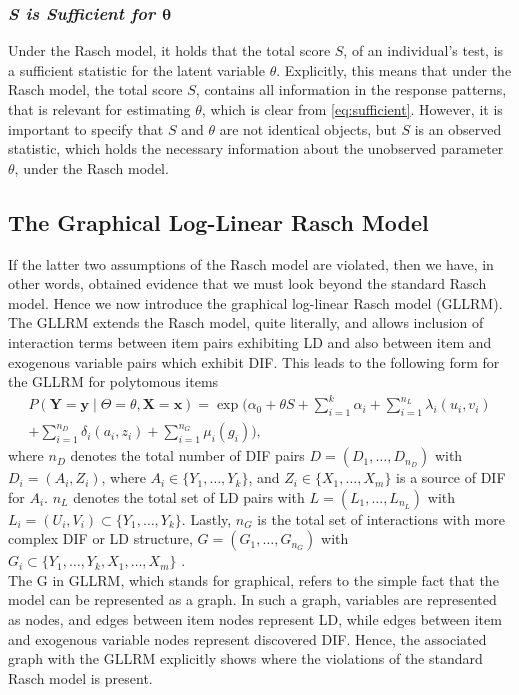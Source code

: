 \documentclass[a4project,12pt]{article}
\theoremstyle{examplestyle}
\theoremstyle{defstyle}
\theoremstyle{thmstyle}
\begin{document}
\subsubsection{\textit{\textbf{\textit{S}} is Sufficient for $\mathbf{\theta}$}}
Under the Rasch model, it holds that the total score $S$, of an individual's test, is a sufficient statistic for the latent variable $\theta$. Explicitly, this means that under the Rasch model, the total score $S$, contains all information in the response patterns, that is relevant for estimating $\theta$, which is clear from \eqref{eq:sufficient}. However, it is important to specify that $S$ and $\theta$ are not identical objects, but $S$ is an observed statistic, which holds the necessary information about the unobserved parameter $\theta$, under the Rasch model.

\subsection{The Graphical Log-Linear Rasch Model}
If the latter two assumptions of the Rasch model are violated, then we have, in other words, obtained evidence that we must look beyond the standard Rasch model. Hence we now introduce the graphical log-linear Rasch model (GLLRM). The GLLRM extends the Rasch model, quite literally, and allows inclusion of interaction terms between item pairs exhibiting LD and also between item and exogenous variable pairs which exhibit DIF. This leads to the following form for the GLLRM for polytomous items 
\begin{align}
    P(\mathbf{Y}=\mathbf{y}\mid \Theta=\theta,\mathbf{X}=\mathbf{x}) = \exp\Big(\alpha_0+\theta S+\sum_{i=1}^k\alpha_i+\sum_{i=1}^{n_L}\lambda_i(u_i,v_i)\\+ \sum_{i=1}^{n_D}\delta_i(a_i,z_i)+\sum_{i=1}^{n_G}\mu_i(g_i)\Big),
\end{align}
where $n_D$ denotes the total number of DIF pairs $D=(D_1,\dots,D_{n_D})$ with $D_i=(A_i,Z_i)$, where $A_i\in\{Y_1,\dots,Y_k\}$, and $Z_i\in\{X_1,\dots,X_m\}$ is a source of DIF for $A_i$. $n_L$ denotes the total set of LD pairs with $L=(L_1,\dots,L_{n_L})$ with $L_i=(U_i,V_i)\subset \{Y_1,\dots,Y_k\}$. Lastly, $n_G$ is the total set of interactions with more complex DIF or LD structure, $G=(G_1,\dots,G_{n_G})$ with $G_i\subset \{Y_1,\dots,Y_k,X_1,\dots,X_m\}$ \cite{Kreiner_Christensen_2011}. \\
The G in GLLRM, which stands for graphical, refers to the simple fact that the model can be represented as a graph. In such a graph, variables are represented as nodes, and edges between item nodes represent LD, while edges between item and exogenous variable nodes represent discovered DIF. Hence, the associated graph with the GLLRM explicitly shows where the violations of the standard Rasch model is present. 
\end{document}
